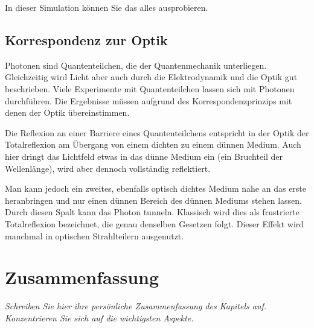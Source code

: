 \begin{questions}
    \item In dieser Simulation können Sie das alles ausprobieren. 
\end{questions}

\subsection{Korrespondenz zur Optik}

Photonen sind Quantenteilchen, die der Quantenmechanik unterliegen. Gleichzeitig wird Licht aber auch durch die Elektrodynamik und die Optik gut beschrieben. Viele Experimente mit Quantenteilchen lassen sich mit Photonen durchführen. Die Ergebnisse müssen aufgrund des Korrespondenzprinzips mit denen der Optik übereinstimmen.

Die Reflexion an einer Barriere eines Quantenteilchens entspricht in der Optik der Totalreflexion am Übergang von einem dichten zu einem dünnen Medium. Auch hier dringt das Lichtfeld etwas in das dünne Medium ein (ein Bruchteil der Wellenlänge), wird aber dennoch vollständig reflektiert.

Man kann jedoch ein zweites, ebenfalls optisch dichtes Medium nahe an das erste heranbringen und nur einen dünnen Bereich des dünnen Mediums stehen lassen. Durch diesen Spalt kann das Photon tunneln. Klassisch wird dies als frustrierte Totalreflexion bezeichnet, die genau denselben Gesetzen folgt. Dieser Effekt wird manchmal in optischen Strahlteilern ausgenutzt.





\section{Zusammenfassung}

\textit{Schreiben Sie hier ihre persönliche Zusammenfassung des Kapitels auf. Konzentrieren Sie sich auf die wichtigsten Aspekte.}

\vspace*{10cm}



\printbibliography[segment=\therefsegment,heading=subbibliography]
